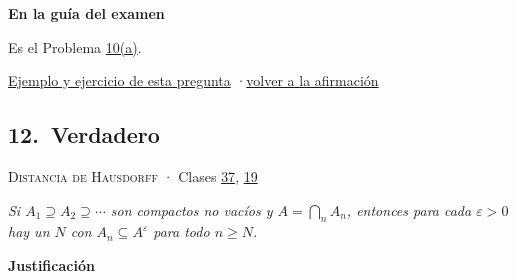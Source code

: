 \documentclass[11pt,a4paper]{article}
\newcommand{\bloque}[1]{\par\smallskip\noindent\textbf{\color{acento}#1}\par}
\begin{document}
\bloque{En la guía del examen}
\begin{pasos}
\item[] Es el Problema \hyperlink{prob-10}{10(a)}.
\end{pasos}
\par{}
\par{\small \hyperlink{e-11}{Ejemplo y ejercicio de esta pregunta} \quad·\quad \hyperlink{q-11}{volver a la afirmación}}
\subsection*{\hypertarget{r-12}{}12.\ \textcolor{ok}{Verdadero}}
{\small \textsc{Distancia de Hausdorff} · Clases \href{https://decostruttivismo.github.io/MAT2514-repaso/pdf/MAT2514_apuntes_completos.pdf\#nameddest=section.37}{37}, \href{https://decostruttivismo.github.io/MAT2514-repaso/pdf/MAT2514_apuntes_completos.pdf\#nameddest=section.19}{19}}\par
\emph{Si $A_1\supseteq A_2\supseteq\cdots$ son compactos no vacíos y $A=\bigcap_nA_n$, entonces para cada $\varepsilon\gt 0$ hay un $N$ con $A_n\subseteq A^\varepsilon$ para todo $n\ge N$.}
\bloque{Justificación}
\end{document}
